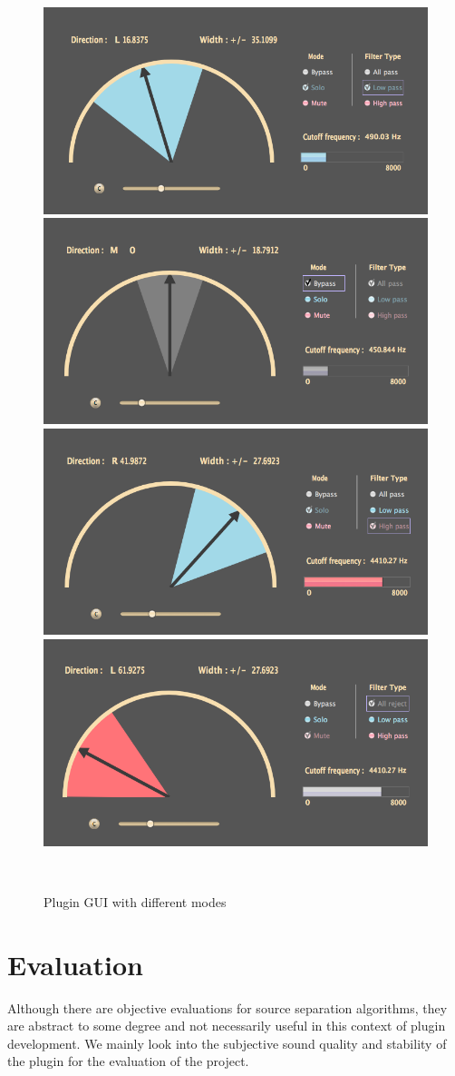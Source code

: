 \documentclass{sig-alternate}
\begin{document}
\begin{figure}
  \begin{minipage}{0.49\textwidth}
    \centering
    \includegraphics[width=.48\textwidth]{UI1}\quad
    \includegraphics[width=.48\textwidth]{UI2}\\
    \includegraphics[width=.48\textwidth]{UI3}\quad
    \includegraphics[width=.48\textwidth]{UI4}
    \caption{Plugin GUI with different modes}
    \label{fig:UI}
  \end{minipage}\\[1em]
\end{figure}
	

\section{Evaluation}\label{sec:evaluation}

Although there are objective evaluations for source separation algorithms, they are abstract to some degree and not necessarily useful in this context of plugin development. We mainly look into the subjective sound quality and stability of the plugin for the evaluation of the project. 
    
\end{document}
